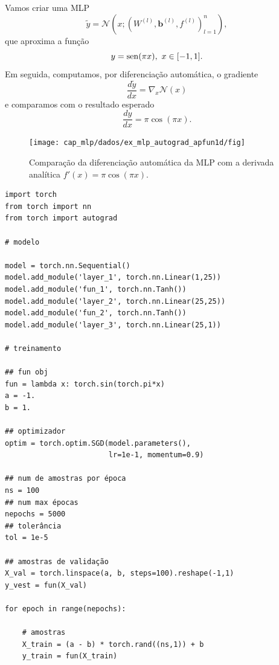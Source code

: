 \begin{ex}\label{ex_mlp_autograd_apfun1d}
  Vamos criar uma MLP
  \begin{equation}
    \tilde{y} = \mathcal{N}\left(x; \left(W^{(l)}, \pmb{b}^{(l)}, f^{(l)}\right)_{l=1}^{n}\right),
  \end{equation}
  que aproxima a função
  \begin{equation}
    y = \operatorname{sen}(\pi x), ~x\in [-1, 1].
  \end{equation}
  Em seguida, computamos, por diferenciação automática, o gradiente
  \begin{equation}
    \frac{d\tilde{y}}{dx} = \nabla_x\mathcal{N}(x)
  \end{equation}
  e comparamos com o resultado esperado
  \begin{equation}
    \frac{dy}{dx} = \pi\cos(\pi x).
  \end{equation}

  \begin{figure}[H]
    \centering
    \texttt{[image: cap\_mlp/dados/ex\_mlp\_autograd\_apfun1d/fig]}
    \caption{Comparação da diferenciação automática da MLP com a derivada analítica $f'(x)=\pi\cos(\pi x)$.}
    \label{fig:mlp_autograd_apfun1d}
  \end{figure}
  
\begin{lstlisting}[caption=mlp\_autograd\_apfun1d.py]
import torch
from torch import nn
from torch import autograd

# modelo

model = torch.nn.Sequential()
model.add_module('layer_1', torch.nn.Linear(1,25))
model.add_module('fun_1', torch.nn.Tanh())
model.add_module('layer_2', torch.nn.Linear(25,25))
model.add_module('fun_2', torch.nn.Tanh())
model.add_module('layer_3', torch.nn.Linear(25,1))

# treinamento

## fun obj
fun = lambda x: torch.sin(torch.pi*x)
a = -1.
b = 1.

## optimizador
optim = torch.optim.SGD(model.parameters(),
                        lr=1e-1, momentum=0.9)

## num de amostras por época
ns = 100
## num max épocas
nepochs = 5000
## tolerância
tol = 1e-5

## amostras de validação
X_val = torch.linspace(a, b, steps=100).reshape(-1,1)
y_vest = fun(X_val)

for epoch in range(nepochs):

    # amostras
    X_train = (a - b) * torch.rand((ns,1)) + b
    y_train = fun(X_train)
    

\end{lstlisting}
\end{ex}
